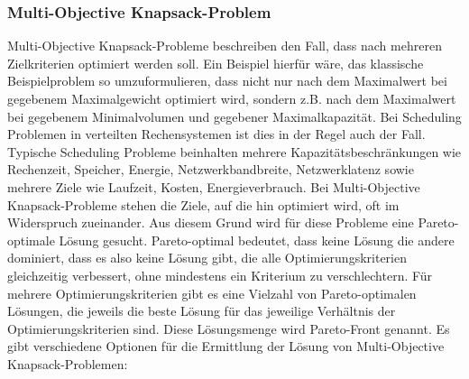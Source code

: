 \subsubsection{Multi-Objective Knapsack-Problem}

Multi-Objective Knapsack-Probleme beschreiben den Fall, dass nach mehreren Zielkriterien optimiert werden soll. Ein Beispiel hierfür wäre, das klassische Beispielproblem so umzuformulieren, dass nicht nur nach dem Maximalwert bei gegebenem Maximalgewicht optimiert wird, sondern z.B. nach dem Maximalwert bei gegebenem Minimalvolumen und gegebener Maximalkapazität. Bei Scheduling Problemen in verteilten Rechensystemen ist dies in der Regel auch der Fall. Typische Scheduling Probleme beinhalten mehrere Kapazitätsbeschränkungen wie Rechenzeit, Speicher, Energie, Netzwerkbandbreite, Netzwerklatenz sowie mehrere Ziele wie Laufzeit, Kosten, Energieverbrauch. Bei Multi-Objective Knapsack-Probleme stehen die Ziele, auf die hin optimiert wird, oft im Widerspruch zueinander. Aus diesem Grund wird für diese Probleme eine Pareto-optimale Lösung gesucht. Pareto-optimal bedeutet, dass keine Lösung die andere dominiert, dass es also keine Lösung gibt, die alle Optimierungskriterien gleichzeitig verbessert, ohne mindestens ein Kriterium zu verschlechtern. Für mehrere Optimierungskriterien gibt es eine Vielzahl von Pareto-optimalen Lösungen, die jeweils die beste Lösung für das jeweilige Verhältnis der Optimierungskriterien sind. Diese Lösungsmenge wird Pareto-Front genannt. Es gibt verschiedene Optionen für die Ermittlung der Lösung von Multi-Objective Knapsack-Problemen:

